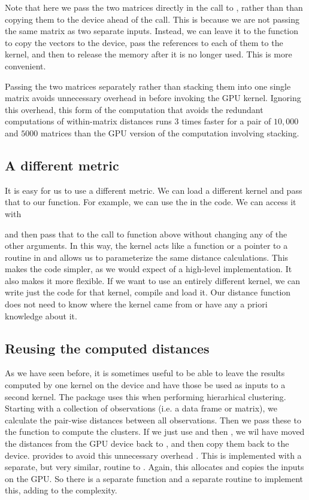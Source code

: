 Note that here we pass the two matrices directly in the call to
, rather than than copying them to the device ahead of the
call.  This is because we are not passing the same matrix as two
separate inputs.  Instead, we can leave it to the 
function to copy the vectors to the device, pass the references
to each of them to the kernel, and then to release the memory 
after it is no longer used. This is more convenient.

Passing the two matrices separately rather than stacking them into one
single matrix avoids unnecessary overhead in \R{} before invoking the
GPU kernel. Ignoring this overhead, this form of the computation that
avoids the redundant computations of within-matrix distances runs 3
times faster for a pair of $10,000$ and $5000$ matrices than the GPU
version of the computation involving stacking.


\subsection{A different metric}
It is easy for us to use a different metric.  We can load a different
kernel and pass that to our function. 
For example, we can use the  in the
 code.
We can access it with 
and then pass that to the call to  function above without
changing any of the other arguments.  In this way, the kernel acts
like a function or a pointer to a routine in \C{} and allows us to
parameterize the same distance calculations.  This makes the code
simpler, as we would expect of a high-level implementation.  It also
makes it more flexible. If we want to use an entirely different
kernel, we can write just the code for that kernel, compile and load
it.  Our distance function does not need to know where the kernel came
from or have any a priori knowledge about it.


\subsection{Reusing the computed distances}
As we have seen before, it is sometimes useful to be able to leave the
results computed by one kernel on the device and have those be used as
inputs to a second kernel.  The  package uses this when
performing hierarhical clustering.  Starting with a collection of
observations (i.e. a data frame or matrix), we calculate the pair-wise
distances between all observations.  Then we pass these to the
 function to compute the clusters.  If we just use
 and then , we wil have moved the
distances from the GPU device back to \R, and then copy them back to
the device.   provides  to avoid
this unnecessary overhead .  This is implemented with a separate, but
very similar, routine to .  Again, this allocates and
copies the inputs on the GPU.  So there is a separate \R{} function
and a separate \C{} routine to implement this, adding to the
complexity.

